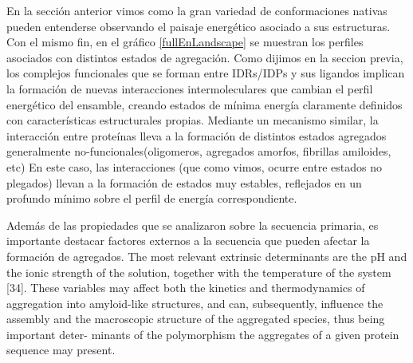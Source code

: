 En la sección anterior vimos como la gran variedad de conformaciones nativas pueden entenderse observando el paisaje energético asociado a sus estructuras.
Con el mismo fin, en el gráfico \ref{fullEnLandscape} se muestran los perfiles asociados con distintos estados de agregación.
Como dijimos en la seccion previa, los complejos funcionales que se forman entre IDRs/IDPs y sus ligandos implican la formación de nuevas interacciones intermoleculares que cambian el perfil energético del ensamble,
creando estados de mínima energía claramente definidos con características estructurales propias.
Mediante un mecanismo similar, la interacción entre proteínas lleva a la formación de distintos estados agregados generalmente no-funcionales(oligomeros, agregados amorfos, fibrillas amiloides, etc)  
En este caso, las interacciones (que como vimos, ocurre entre estados no plegados) llevan a la formación de estados muy estables, reflejados en un profundo mínimo sobre el perfil de energía correspondiente. 


Además de las propiedades que se analizaron sobre la secuencia primaria, es importante destacar factores externos a la secuencia que pueden afectar la formación de agregados.
The most relevant extrinsic determinants are the pH and the ionic strength of the solution, together with the temperature of the system [34].
These variables may affect both the kinetics and thermodynamics of aggregation
into amyloid-like structures, and can, subsequently, influence the assembly and
the macroscopic structure of the aggregated species, thus being important deter-
minants of the polymorphism the aggregates of a given protein sequence may
present.



